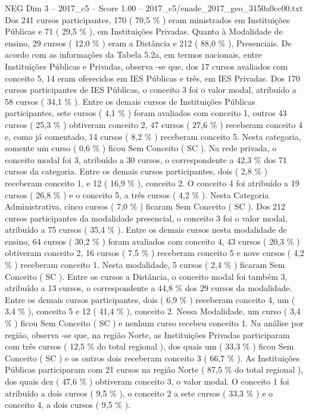 \begin{textsample}{NEG Dim 3 – 2017\_c5 – Score 1.00 – 2017\_c5/enade\_2017\_geo\_3150a0cc00.txt}
Dos 241 cursos participantes, 170 ( 70,5 \% ) eram ministrados em Instituições Públicas e 71 ( 29,5 \% ), em Instituições Privadas.
Quanto à Modalidade de ensino, 29 cursos ( 12,0 \% ) eram a Distância e 212 ( 88,0 \% ), Presenciais.
De acordo com as informações da Tabela 5.2a, em termos nacionais, entre Instituições Públicas e Privadas, observa -se que, dos 17 cursos avaliados com conceito 5, 14 eram oferecidos em IES Públicas e três, em IES Privadas.
Dos 170 cursos participantes de IES Públicas, o conceito 3 foi o valor modal, atribuído a 58 cursos ( 34,1 \% ).
Entre os demais cursos de Instituições Públicas participantes, sete cursos ( 4,1 \% ) foram avaliados com conceito 1, outros 43 cursos ( 25,3 \% ) obtiveram conceito 2, 47 cursos ( 27,6 \% ) receberam conceito 4 e, como já comentado, 14 cursos ( 8,2 \% ) receberam conceito 5.
Nesta categoria, somente um curso ( 0,6 \% ) ficou Sem Conceito ( SC ).
Na rede privada, o conceito modal foi 3, atribuído a 30 cursos, o correspondente a 42,3 \% dos 71 cursos da categoria.
Entre os demais cursos participantes, dois ( 2,8 \% ) receberam conceito 1, e 12 ( 16,9 \% ), conceito 2.
O conceito 4 foi atribuído a 19 cursos ( 26,8 \% ) e o conceito 5, a três cursos ( 4,2 \% ).
Nesta Categoria Administrativa, cinco cursos ( 7,0 \% ) ficaram Sem Conceito ( SC ).
Dos 212 cursos participantes da modalidade presencial, o conceito 3 foi o valor modal, atribuído a 75 cursos ( 35,4 \% ).
Entre os demais cursos nesta modalidade de ensino, 64 cursos ( 30,2 \% ) foram avaliados com conceito 4, 43 cursos ( 20,3 \% ) obtiveram conceito 2, 16 cursos ( 7,5 \% ) receberam conceito 5 e nove cursos ( 4,2 \% ) receberam conceito 1.
Nesta modalidade, 5 cursos ( 2,4 \% ) ficaram Sem Conceito ( SC ).
Entre os cursos a Distância, o conceito modal foi também 3, atribuído a 13 cursos, o correspondente a 44,8 \% dos 29 cursos da modalidade.
Entre os demais cursos participantes, dois ( 6,9 \% ) receberam conceito 4, um ( 3,4 \% ), conceito 5 e 12 ( 41,4 \% ), conceito 2.
Nessa Modalidade, um curso ( 3,4 \% ) ficou Sem Conceito ( SC ) e nenhum curso recebeu conceito 1.
Na análise por região, observa -se que, na região Norte, as Instituições Privadas participaram com três cursos ( 12,5 \% do total regional ), dos quais um ( 33,3 \% ) ficou Sem Conceito ( SC ) e os outros dois receberam conceito 3 ( 66,7 \% ).
As Instituições Públicas participaram com 21 cursos na região Norte ( 87,5 \% do total regional ), dos quais dez ( 47,6 \% ) obtiveram conceito 3, o valor modal.
O conceito 1 foi atribuído a dois cursos ( 9,5 \% ), o conceito 2 a sete cursos ( 33,3 \% ) e o conceito 4, a dois cursos ( 9,5 \% ).

\end{textsample}
